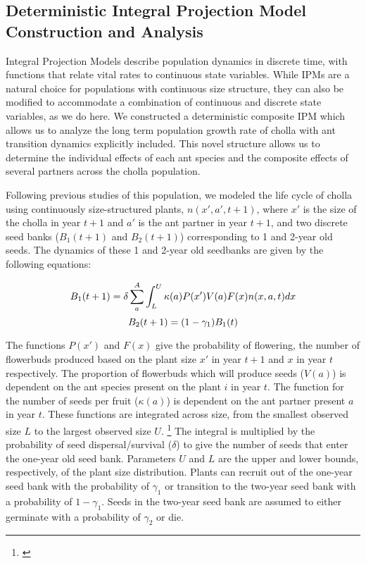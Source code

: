 \documentclass[11pt]{article}
\newcommand{\ali}[2]{{\color{pink}{#1}}\footnote{\textit{\color{pink}{#2}}}}
\begin{document}
\subsection*{Deterministic Integral Projection Model Construction and Analysis}
  
Integral Projection Models describe population dynamics in discrete time, with functions that relate vital rates to continuous state variables. 
While IPMs are a natural choice for populations with continuous size structure, they can also be modified to accommodate a combination of continuous and discrete state variables, as we do here. 
We constructed a deterministic composite IPM which allows us to analyze the long term population growth rate of cholla with ant transition dynamics explicitly included.
This novel structure allows us to determine the individual effects of each ant species and the composite effects of several partners across the cholla population. 

Following previous studies of this population, we modeled the life cycle of cholla using continuously size-structured plants, $n(x',a',t+1)$, where $x'$ is the size of the cholla in year $t+1$ and $a'$ is the ant partner in year $t+1$, and two discrete seed banks ($B_{1}(t+1)$ and $B_{2}(t+1)$) corresponding to 1 and 2-year old seeds.
The dynamics of these 1 and 2-year old seedbanks are given by the following equations:

  \begin{linenomath*}
		$$
		B_1(t+1) = \delta \sum_{a}^{A} \int_L^U  \kappa(a) P(x') V(a) F(x) n(x,a,t) dx \\
		$$
		$$
		B_2(t+1) =  (1 - \gamma_1)B_1(t)\\
		$$
  \end{linenomath*}

The functions $P(x')$ and $F(x)$ give the probability of flowering, the number of flowerbuds produced based on the plant size $x'$ in year $t+1$ and $x$ in year $t$ respectively. 
The proportion of flowerbuds which will produce seeds ($V(a)$) is dependent on the ant species present on the plant $i$ in year $t$. 
The function for the number of seeds per fruit ($\kappa(a)$)  is dependent on the ant partner present $a$ in year $t$.
These functions are integrated across size, from the smallest observed size $L$ to the largest observed size $U$. \ali{}{I know that technically L is smaller than the smallest size and U is larger, but I am not sure if here is the place to put it. }
The integral is multiplied by the probability of seed dispersal/survival ($\delta$) to give the number of seeds that enter the one-year old seed bank. 
Parameters $U$ and $L$ are the upper and lower bounds, respectively, of the plant size distribution. 
Plants can recruit out of the one-year seed bank with the probability of $\gamma_1$ or transition to the two-year seed bank with a probability of $1 - \gamma_1$. 
Seeds in the two-year seed bank are assumed to either germinate with a probability of $\gamma_2$ or die. 
		
\end{document}
